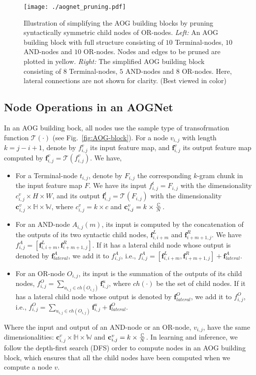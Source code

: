 \documentclass[10pt,twocolumn,letterpaper]{article}
\begin{document}
\begin{figure} %
    	\centering
    	\texttt{[image: ./aognet\_pruning.pdf]}
    	\caption{\small{Illustration of simplifying the AOG building blocks by pruning syntactically symmetric child nodes of OR-nodes. \textit{Left:} An AOG building block with full structure consisting of  $10$ Terminal-nodes, $10$ AND-nodes and $10$ OR-nodes. Nodes and edges to be pruned are plotted in yellow. \textit{Right:} The simplified AOG building block consisting of  $8$ Terminal-nodes, $5$ AND-nodes and $8$ OR-nodes. Here, lateral connections are not shown for clarity. (Best viewed in color)}
    	}
    	\label{fig:pruning} %
\end{figure}


\subsection{Node Operations in an AOGNet}
In an AOG building bock, all nodes use the sample type of transofrmation function $\mathcal{T}(\cdot)$ (see Fig.~\ref{fig:AOG-block}). For a node $v_{i,j}$ with length $k=j-i+1$, denote by $f^v_{i,j}$ its input feature map,  and $\mathbf{f}^v_{i,j}$ its output feature map computed by $\mathbf{f}^v_{i,j}=\mathcal{T}(f^v_{i,j})$. We have, 
\begin{itemize}[leftmargin=*]
\itemsep0em
    \item For a Terminal-node $t_{i,j}$, denote by $F_{i,j}$ the corresponding $k$-gram chunk in the input feature map $F$. We have its input $f^t_{i,j}=F_{i,j}$ with the dimensionality $c^v_{i,j}\times H \times W$, and its output $\mathbf{f}^t_{i,j}=\mathcal{T}(F_{i,j})$ with the dimensionality $\mathbf{c}^v_{i,j}\times \mathbb{H} \times \mathbb{W}$, where $c^v_{i,j}=k\times c$ and $\mathbf{c}^v_{i,j}=k\times {\mathbb{C}\over N}$.  
    \item For an AND-node $A_{i,j}(m)$, its input is computed by the concatenation of the outputs of its two syntactic child nodes, $\mathbf{f}^L_{i,i+m}$ and $\mathbf{f}^R_{i+m+1, j}$. We have $f^A_{i,j}=[\mathbf{f}^L_{i,i+m}, \mathbf{f}^R_{i+m+1, j}]$. If it has a lateral child node whose output is denoted by $\mathbf{f}^A_{lateral}$, we add it to $f^A_{i,j}$, i.e.,  $f^A_{i,j}=[\mathbf{f}^L_{i,i+m}, \mathbf{f}^R_{i+m+1, j}]+\mathbf{f}^A_{lateral}$.   
    \item For an OR-node $O_{i,j}$, its input  is the summation of the outputs of its child nodes, $f^O_{i,j}=\sum_{u_{i,j}\in ch(O_{i,j})} \mathbf{f}^u_{i,j}$, where $ch(\cdot)$ be the set of child nodes. If it has a lateral child node whose output is denoted by $\mathbf{f}^O_{lateral}$, we add it to $f^O_{i,j}$, i.e.,  $f^O_{i,j}=\sum_{u_{i,j}\in ch(O_{i,j})} \mathbf{f}^u_{i,j}+\mathbf{f}^O_{lateral}$. 
\end{itemize}
Where the input and output of an AND-node or an OR-node, $v_{i,j}$, have the same dimensionalities: $\mathbf{c}^v_{i,j} \times \mathbb{H}\times \mathbb{W}$ and $\mathbf{c}^v_{i,j}=k\times {\mathbb{C}\over N}$.  
In learning and inference, we follow the depth-first search (DFS) order to compute nodes in an AOG building block, which ensures that all the child nodes have been computed when we compute a node $v$.   
\end{document}
